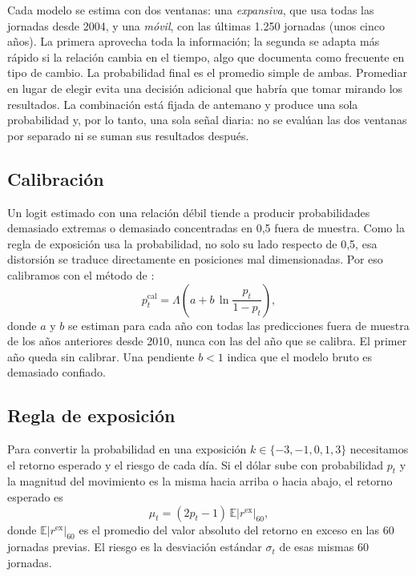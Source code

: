 \documentclass[11pt,a4paper]{article}
\newcommand{\rex}{r^{\text{ex}}}
\newcommand{\E}{\mathbb{E}}
\begin{document}
Cada modelo se estima con dos ventanas: una \emph{expansiva}, que usa todas las jornadas desde 2004, y una \emph{móvil}, con las últimas 1.250 jornadas (unos cinco años). La primera aprovecha toda la información; la segunda se adapta más rápido si la relación cambia en el tiempo, algo que \citet{rossi2013} documenta como frecuente en tipo de cambio. La probabilidad final es el promedio simple de ambas. Promediar en lugar de elegir evita una decisión adicional que habría que tomar mirando los resultados. La combinación está fijada de antemano y produce una sola probabilidad y, por lo tanto, una sola señal diaria: no se evalúan las dos ventanas por separado ni se suman sus resultados después.

\subsection{Calibración}
Un logit estimado con una relación débil tiende a producir probabilidades demasiado extremas o demasiado concentradas en 0,5 fuera de muestra. Como la regla de exposición usa la probabilidad, no solo su lado respecto de 0,5, esa distorsión se traduce directamente en posiciones mal dimensionadas. Por eso calibramos con el método de \citet{platt1999}:
\begin{equation}\label{eq:platt}
p^{\text{cal}}_{t} = \Lambda\!\left(a + b\,\ln\frac{p_t}{1-p_t}\right),
\end{equation}
donde \(a\) y \(b\) se estiman para cada año con todas las predicciones fuera de muestra de los años anteriores desde 2010, nunca con las del año que se calibra. El primer año queda sin calibrar. Una pendiente \(b<1\) indica que el modelo bruto es demasiado confiado.

\subsection{Regla de exposición}
Para convertir la probabilidad en una exposición \(k\in\{-3,-1,0,1,3\}\) necesitamos el retorno esperado y el riesgo de cada día. Si el dólar sube con probabilidad \(p_t\) y la magnitud del movimiento es la misma hacia arriba o hacia abajo, el retorno esperado es
\begin{equation}\label{eq:mu}
\mu_t=(2p_t-1)\,\E|\rex|_{60},
\end{equation}
donde \(\E|\rex|_{60}\) es el promedio del valor absoluto del retorno en exceso en las 60 jornadas previas. El riesgo es la desviación estándar \(\sigma_t\) de esas mismas 60 jornadas.
\end{document}
